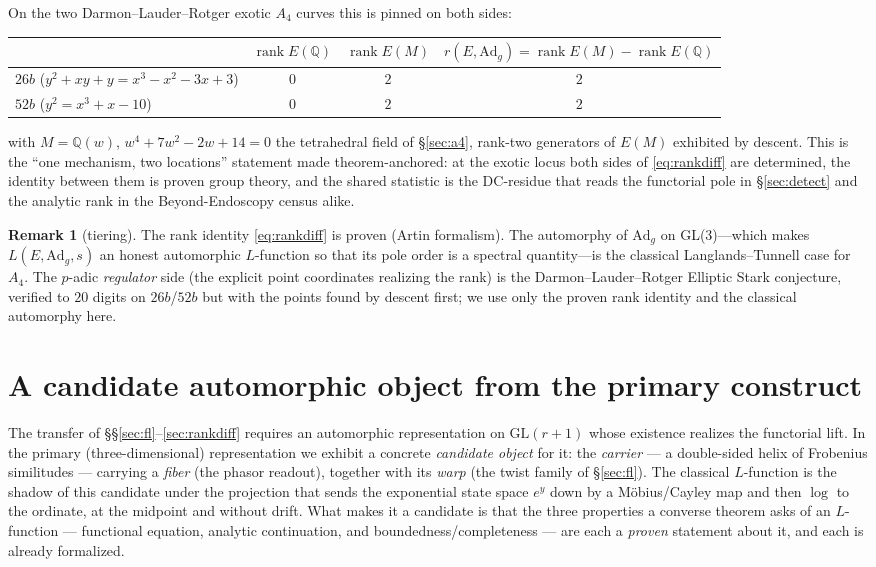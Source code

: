 \documentclass[11pt]{article}
\theoremstyle{definition}
\newtheorem{remark}[theorem]{Remark}
\begin{document}
On the two Darmon--Lauder--Rotger exotic $A_4$ curves this is pinned on both sides:
\begin{center}
\begin{tabular}{lccc}
\toprule
 & $\operatorname{rank}E(\mathbb Q)$ & $\operatorname{rank}E(M)$ & $r(E,\mathrm{Ad}_g)=\operatorname{rank}E(M)-\operatorname{rank}E(\mathbb Q)$ \\
\midrule
$26b$ ($y^2+xy+y=x^3-x^2-3x+3$) & $0$ & $2$ & $2$ \\
$52b$ ($y^2=x^3+x-10$) & $0$ & $2$ & $2$ \\
\bottomrule
\end{tabular}
\end{center}
with $M=\mathbb Q(w)$, $w^4+7w^2-2w+14=0$ the tetrahedral field of \S\ref{sec:a4}, rank-two
generators of $E(M)$ exhibited by descent. This is the ``one mechanism, two locations'' statement
made theorem-anchored: at the exotic locus both sides of \eqref{eq:rankdiff} are determined, the
identity between them is proven group theory, and the shared statistic is the DC-residue that reads
the functorial pole in \S\ref{sec:detect} and the analytic rank in the Beyond-Endoscopy census
alike.

\begin{remark}[tiering]
The rank identity \eqref{eq:rankdiff} is proven (Artin formalism). The automorphy of $\mathrm{Ad}_g$
on GL(3)---which makes $L(E,\mathrm{Ad}_g,s)$ an honest automorphic $L$-function so that its pole order
is a spectral quantity---is the classical Langlands--Tunnell case for $A_4$. The $p$-adic
\emph{regulator} side (the explicit point coordinates realizing the rank) is the Darmon--Lauder--Rotger
Elliptic Stark conjecture, verified to $20$ digits on $26b$/$52b$ but with the points found by
descent first; we use only the proven rank identity and the classical automorphy here.
\end{remark}

\section{A candidate automorphic object from the primary construct}\label{sec:construct}

The transfer of \S\S\ref{sec:fl}--\ref{sec:rankdiff} requires an automorphic representation on
$\mathrm{GL}(r+1)$ whose existence realizes the functorial lift. In the primary (three-dimensional)
representation we exhibit a concrete \emph{candidate object} for it: the \emph{carrier} --- a
double-sided helix of Frobenius similitudes --- carrying a \emph{fiber} (the phasor readout), together
with its \emph{warp} (the twist family of \S\ref{sec:fl}). The classical $L$-function is the shadow of
this candidate under the projection that sends the exponential state space $e^{y}$ down by a
M\"obius/Cayley map and then $\log$ to the ordinate, at the midpoint and without drift. What makes it
a candidate is that the three properties a converse theorem asks of an $L$-function --- functional
equation, analytic continuation, and boundedness/completeness --- are each a \emph{proven} statement
about it, and each is already formalized.
\end{document}
